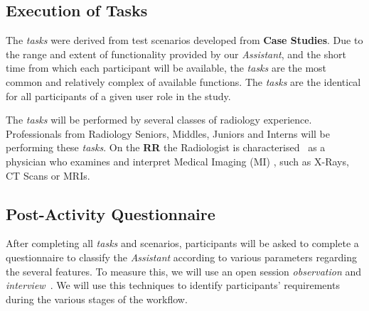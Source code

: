 
\subsection{Execution of Tasks}

The \textit{tasks} were derived from test scenarios developed from \textbf{Case Studies}. Due to the range and extent of functionality provided by our \textit{Assistant}, and the short time from which each participant will be available, the \textit{tasks} are the most common and relatively complex of available functions. The \textit{tasks} are the identical for all participants of a given user role in the study.

The \textit{tasks} will be performed by several classes of radiology experience. Professionals from Radiology Seniors, Middles, Juniors and Interns will be performing these \textit{tasks}. On the \textbf{RR} the Radiologist is characterised~\cite{ehrlich2016patient, miglioretti2007radiologist} as a physician who examines and interpret Medical Imaging (MI) \cite{kobashi2017evaluation}, such as X-Rays, CT Scans or MRIs.



\subsection{Post-Activity Questionnaire}

After completing all \textit{tasks} and scenarios, participants will be asked to complete a questionnaire to classify the \textit{Assistant} according to various parameters regarding the several features. To measure this, we will use an open session \textit{observation} and \textit{interview}~\cite{carayon2015systematic}. We will use this techniques to identify participants' requirements during the various stages of the workflow.













